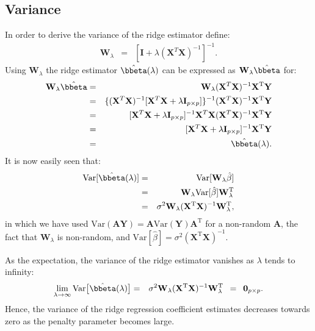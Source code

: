 \documentclass[a4paper]{article}
\theoremstyle{myexamplestyle}
\begin{document}
\subsection{Variance}
In order to derive the variance of the ridge estimator define:
\begin{eqnarray*}
\mathbf{W}_{\lambda} & = & [\mathbf{I} + \lambda (\mathbf{X}^T \mathbf{X})^{-1} ]^{-1}.
\end{eqnarray*}
Using $\mathbf{W}_{\lambda}$ the ridge estimator $\hat{\bbeta}(\lambda)$ can be expressed as $\mathbf{W}_{\lambda} \hat{\bbeta}$ for:
\begin{eqnarray*}
\mathbf{W}_{\lambda} \hat{\bbeta} & = & \mathbf{W}_{\lambda} (\mathbf{X}^T \mathbf{X})^{-1} \mathbf{X}^{\mathrm{T}} \mathbf{Y} 
\\
& = & \{ (\mathbf{X}^T \mathbf{X})^{-1}   [ \mathbf{X}^T \mathbf{X} + \lambda \mathbf{I}_{p \times p} ] \}^{-1}  (\mathbf{X}^T \mathbf{X})^{-1} \mathbf{X}^{\mathrm{T}} \mathbf{Y} 
\\
& = &  [  \mathbf{X}^T \mathbf{X} + \lambda \mathbf{I}_{p \times p} ]^{-1} \mathbf{X}^T \mathbf{X}  (\mathbf{X}^T \mathbf{X})^{-1} \mathbf{X}^{\mathrm{T}} \mathbf{Y} 
\\
& = &  [  \mathbf{X}^T \mathbf{X} + \lambda \mathbf{I}_{p \times p} ]^{-1} \mathbf{X}^{\mathrm{T}} \mathbf{Y} 
\\
& = &  \hat{\bbeta}(\lambda).
\end{eqnarray*}
It is now easily seen that:
\begin{eqnarray*}
\mbox{Var}[ \hat{\bbeta}(\lambda) ] & = & \mbox{Var}[ \mathbf{W}_{\lambda} \hat{\beta} ]
\\
& = &   \mathbf{W}_{\lambda}  \mbox{Var}[\hat{\beta} ]  \mathbf{W}_{\lambda}^{\mathrm{T}}
\\
& = &  \sigma^2 \mathbf{W}_{\lambda}  (\mathbf{X}^{\mathrm{T}} \mathbf{X})^{-1}  \mathbf{W}_{\lambda}^{\mathrm{T}},
\end{eqnarray*}
in which we have used $\mbox{Var}(\mathbf{A} \mathbf{Y}) = \mathbf{A} \mbox{Var}( \mathbf{Y}) \mathbf{A}^{\mathrm{T}}$ for a non-random $\mathbf{A}$, the fact that $\mathbf{W}_{\lambda}$ is non-random, and $ \mbox{Var}[\hat{\beta} ] = \sigma^2 (\mathbf{X}^{\mathrm{T}} \mathbf{X})^{-1}$.

As the expectation, the variance of the ridge estimator vanishes as $\lambda$ tends to infinity:
\begin{eqnarray*}
\lim_{\lambda \rightarrow \infty} \mbox{Var} \big[ \hat{\bbeta}(\lambda) \big] & = & \sigma^2 \mathbf{W}_{\lambda}  (\mathbf{X}^{\mathrm{T}} \mathbf{X})^{-1}  \mathbf{W}_{\lambda}^{\mathrm{T}} \, \, \, = \, \, \, \mathbf{0}_{p \times p}.
\end{eqnarray*}
Hence, the variance of the ridge regression coefficient estimates decreases towards zero as the penalty parameter becomes large.
\end{document}
